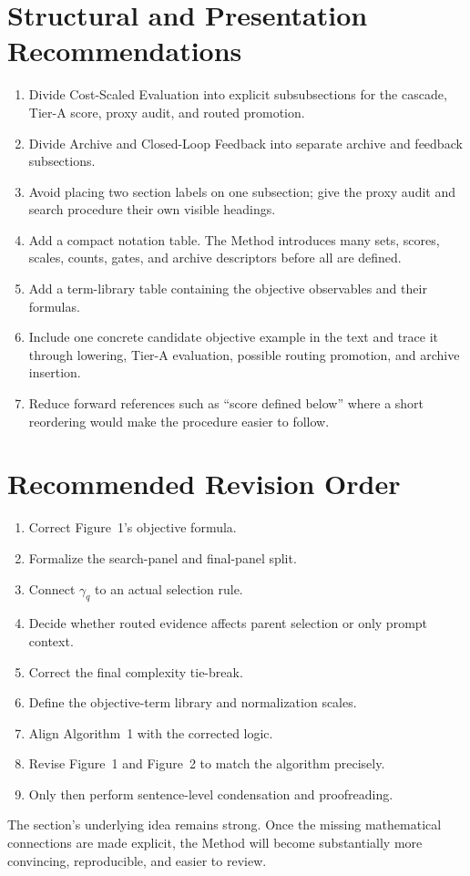 \documentclass[11pt]{article}
\begin{document}
\section{Structural and Presentation Recommendations}

\begin{enumerate}
  \item Divide Cost-Scaled Evaluation into explicit subsubsections for the
  cascade, Tier-A score, proxy audit, and routed promotion.

  \item Divide Archive and Closed-Loop Feedback into separate archive and
  feedback subsections.

  \item Avoid placing two section labels on one subsection; give the proxy audit
  and search procedure their own visible headings.

  \item Add a compact notation table. The Method introduces many sets, scores,
  scales, counts, gates, and archive descriptors before all are defined.

  \item Add a term-library table containing the objective observables and their
  formulas.

  \item Include one concrete candidate objective example in the text and trace
  it through lowering, Tier-A evaluation, possible routing promotion, and
  archive insertion.

  \item Reduce forward references such as ``score defined below'' where a short
  reordering would make the procedure easier to follow.
\end{enumerate}

\section{Recommended Revision Order}

\begin{enumerate}
  \item Correct Figure~1's objective formula.
  \item Formalize the search-panel and final-panel split.
  \item Connect $\gamma_q$ to an actual selection rule.
  \item Decide whether routed evidence affects parent selection or only prompt
  context.
  \item Correct the final complexity tie-break.
  \item Define the objective-term library and normalization scales.
  \item Align Algorithm~1 with the corrected logic.
  \item Revise Figure~1 and Figure~2 to match the algorithm precisely.
  \item Only then perform sentence-level condensation and proofreading.
\end{enumerate}

The section's underlying idea remains strong. Once the missing mathematical
connections are made explicit, the Method will become substantially more
convincing, reproducible, and easier to review.
\end{document}

